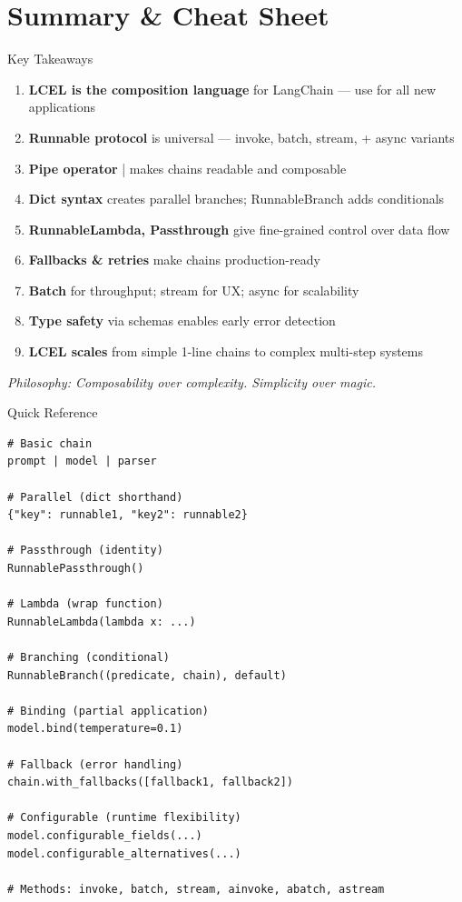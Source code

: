 \documentclass[aspectratio=169,11pt]{beamer}
\begin{document}
\section{Summary \& Cheat Sheet}

\begin{frame}{Key Takeaways}
  \begin{enumerate}\setlength{\itemsep}{1pt}
    \item \textbf{LCEL is the composition language} for LangChain — use for all new applications
    \item \textbf{Runnable protocol} is universal — invoke, batch, stream, + async variants
    \item \textbf{Pipe operator} | makes chains readable and composable
    \item \textbf{Dict syntax} creates parallel branches; RunnableBranch adds conditionals
    \item \textbf{RunnableLambda, Passthrough} give fine-grained control over data flow
    \item \textbf{Fallbacks \& retries} make chains production-ready
    \item \textbf{Batch} for throughput; stream for UX; async for scalability
    \item \textbf{Type safety} via schemas enables early error detection
    \item \textbf{LCEL scales} from simple 1-line chains to complex multi-step systems
  \end{enumerate}

  \vspace{0.3em}
  \small \textit{Philosophy: Composability over complexity. Simplicity over magic.}
\end{frame}

\begin{frame}[fragile,shrink=2]{Quick Reference}
  \small
  \begin{codebox}
\begin{lstlisting}
# Basic chain
prompt | model | parser

# Parallel (dict shorthand)
{"key": runnable1, "key2": runnable2}

# Passthrough (identity)
RunnablePassthrough()

# Lambda (wrap function)
RunnableLambda(lambda x: ...)

# Branching (conditional)
RunnableBranch((predicate, chain), default)

# Binding (partial application)
model.bind(temperature=0.1)

# Fallback (error handling)
chain.with_fallbacks([fallback1, fallback2])

# Configurable (runtime flexibility)
model.configurable_fields(...)
model.configurable_alternatives(...)

# Methods: invoke, batch, stream, ainvoke, abatch, astream
\end{lstlisting}
  \end{codebox}
\end{frame}
\end{document}
